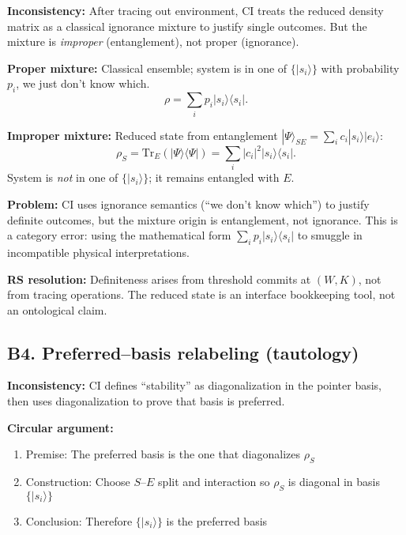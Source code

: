 \documentclass[11pt]{article}
\begin{document}
\begin{alertbox}
\textbf{Inconsistency:} After tracing out environment, CI treats the reduced density matrix as a classical ignorance mixture to justify single outcomes. But the mixture is \emph{improper} (entanglement), not proper (ignorance).
\end{alertbox}

\textbf{Proper mixture:} Classical ensemble; system is in one of $\{|s_i\rangle\}$ with probability $p_i$, we just don't know which.
\begin{equation}
  \rho = \sum_i p_i |s_i\rangle\langle s_i|.
\end{equation}

\textbf{Improper mixture:} Reduced state from entanglement $|\Psi\rangle_{SE}=\sum_i c_i|s_i\rangle|e_i\rangle$:
\begin{equation}
  \rho_S = \text{Tr}_E(|\Psi\rangle\langle\Psi|) = \sum_i |c_i|^2 |s_i\rangle\langle s_i|.
\end{equation}
System is \emph{not} in one of $\{|s_i\rangle\}$; it remains entangled with $E$.

\textbf{Problem:} CI uses ignorance semantics (``we don't know which'') to justify definite outcomes, but the mixture origin is entanglement, not ignorance. This is a category error: using the mathematical form $\sum_i p_i |s_i\rangle\langle s_i|$ to smuggle in incompatible physical interpretations.

\textbf{RS resolution:} Definiteness arises from threshold commits at $(W,K)$, not from tracing operations. The reduced state is an interface bookkeeping tool, not an ontological claim.

\subsection{B4. Preferred--basis relabeling (tautology)}

\begin{alertbox}
\textbf{Inconsistency:} CI defines ``stability'' as diagonalization in the pointer basis, then uses diagonalization to prove that basis is preferred.
\end{alertbox}

\textbf{Circular argument:}
\begin{enumerate}[nosep]
  \item Premise: The preferred basis is the one that diagonalizes $\rho_S$
  \item Construction: Choose $S$--$E$ split and interaction so $\rho_S$ is diagonal in basis $\{|s_i\rangle\}$
  \item Conclusion: Therefore $\{|s_i\rangle\}$ is the preferred basis
\end{enumerate}
\end{document}
